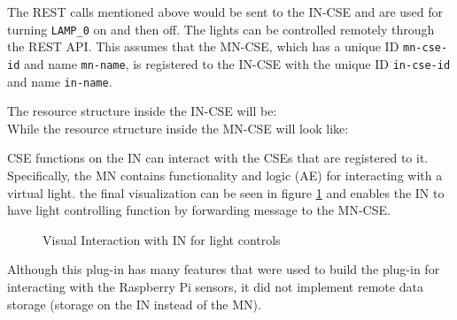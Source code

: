The REST calls mentioned above would be sent to the IN-CSE and are used for turning \lstinline{LAMP_0} on and then off. The lights can be controlled remotely through the REST API. This assumes that the MN-CSE, which has a unique ID \lstinline{mn-cse-id} and name \lstinline{mn-name}, is registered to the IN-CSE with the unique ID \lstinline{in-cse-id} and name \lstinline{in-name}.

The resource structure inside the IN-CSE will be:\\

\clearpage
While the resource structure inside the MN-CSE will look like:\\


CSE functions on the IN can interact with the CSEs that are registered to it. Specifically, the MN contains functionality and logic (AE) for interacting with a virtual light. the final visualization can be seen in figure \ref{light} and enables the IN to have light controlling function by forwarding message to the MN-CSE. 

\begin{figure}[H]
  \centering
  \caption{Visual Interaction with IN for light controls}
  \label{light}
\end{figure}

Although this plug-in has many features that were used to build the plug-in for interacting with the Raspberry Pi sensors, it did not implement remote data storage (storage on the IN instead of the MN).

